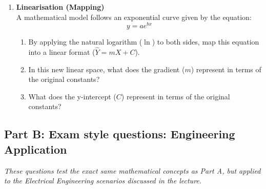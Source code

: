 \begin{enumerate}[label=\textbf{Q\arabic*.}, leftmargin=*]
    \item \textbf{Linearisation (Mapping)} \\
    A mathematical model follows an exponential curve given by the equation:
    \[ y = a e^{bx} \]
    \begin{enumerate}[label=\arabic*.]
        \item By applying the natural logarithm ($\ln$) to both sides, map this equation into a linear format ($\hat{Y} = mX + C$).
        \item In this new linear space, what does the gradient ($m$) represent in terms of the original constants?
        \item What does the y-intercept ($C$) represent in terms of the original constants?
    \end{enumerate}

\end{enumerate}

\vspace{0.8cm}

\subsection*{Part B: Exam style questions: Engineering Application}
\textit{These questions test the exact same mathematical concepts as Part A, but applied to the Electrical Engineering scenarios discussed in the lecture.}

